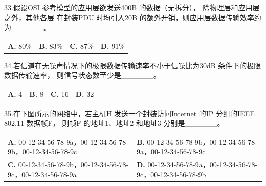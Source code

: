 \documentclass[UTF8,11pt]{ctexart}
\begin{document}
33.假设OSI 参考模型的应用层欲发送400B 的数据（无拆分）， 除物理层和应用层之外，其他各层 在封装PDU 时均引入20B 的额外开销，则应用层数据传输效率约为\_\_\_\_\_\_。


\begin{center}\begin{tabular}{>{\raggedright\arraybackslash}p{\dimexpr(\linewidth-8\tabcolsep)/4\relax}>{\raggedright\arraybackslash}p{\dimexpr(\linewidth-8\tabcolsep)/4\relax}>{\raggedright\arraybackslash}p{\dimexpr(\linewidth-8\tabcolsep)/4\relax}>{\raggedright\arraybackslash}p{\dimexpr(\linewidth-8\tabcolsep)/4\relax}}
\textbf{A.} 80\% & \textbf{B.} 83\% & \textbf{C.} 87\% & \textbf{D.} 91\%\\[.35em]\end{tabular}\end{center}

34.若信道在无噪声情况下的极限数据传输速率不小于信噪比为30dB 条件下的极限数据传输速率， 则信号状态数至少是\_\_\_\_\_\_。


\begin{center}\begin{tabular}{>{\raggedright\arraybackslash}p{\dimexpr(\linewidth-8\tabcolsep)/4\relax}>{\raggedright\arraybackslash}p{\dimexpr(\linewidth-8\tabcolsep)/4\relax}>{\raggedright\arraybackslash}p{\dimexpr(\linewidth-8\tabcolsep)/4\relax}>{\raggedright\arraybackslash}p{\dimexpr(\linewidth-8\tabcolsep)/4\relax}}
\textbf{A.} 4 & \textbf{B.} 8 & \textbf{C.} 16 & \textbf{D.} 32\\[.35em]\end{tabular}\end{center}

35.在下图所示的网络中，若主机H 发送一个封装访问Internet 的IP 分组的IEEE 802.11 数据帧F， 则帧F 的地址1、地址2 和地址3 分别是\_\_\_\_\_\_。


\begin{center}\begin{tabular}{>{\raggedright\arraybackslash}p{\dimexpr(\linewidth-4\tabcolsep)/2\relax}>{\raggedright\arraybackslash}p{\dimexpr(\linewidth-4\tabcolsep)/2\relax}}
\textbf{A.} 00-12-34-56-78-9a，00-12-34-56-78-9b，00-12-34-56-78-9c & \textbf{B.} 00-12-34-56-78-9b，00-12-34-56-78-9a，00-12-34-56-78-9c\\[.35em]
\textbf{C.} 00-12-34-56-78-9b，00-12-34-56-78-9c，00-12-34-56-78-9a & \textbf{D.} 00-12-34-56-78-9a，00-12-34-56-78-9c，00-12-34-56-78-9b\\[.35em]\end{tabular}\end{center}
\end{document}
